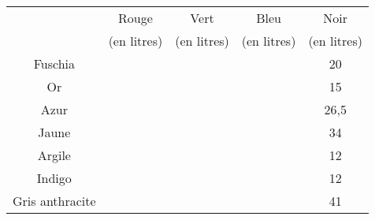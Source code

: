 \documentclass[a4paper,10pt]{beamer}
\begin{document}
{\small
\renewcommand{\arraystretch}{1.5}
\begin{frame}
	\begin{tabular}{|c|c|c|c|c|}
		\hline
		                & Rouge       & Vert        & Bleu        & Noir        \\
		                & (en litres) & (en litres) & (en litres) & (en litres) \\ \hline
		Fuschia         &             &             &             & 20          \\ \hline
		Or              &             &             &             & 15          \\ \hline
		Azur            &             &             &             & 26,5        \\ \hline
		Jaune           &             &             &             & 34          \\ \hline
		Argile          &             &             &             & 12          \\ \hline
		Indigo          &             &             &             & 12          \\ \hline
		Gris anthracite &             &             &             & 41          \\ \hline
	\end{tabular}
\end{frame}}
\end{document}
